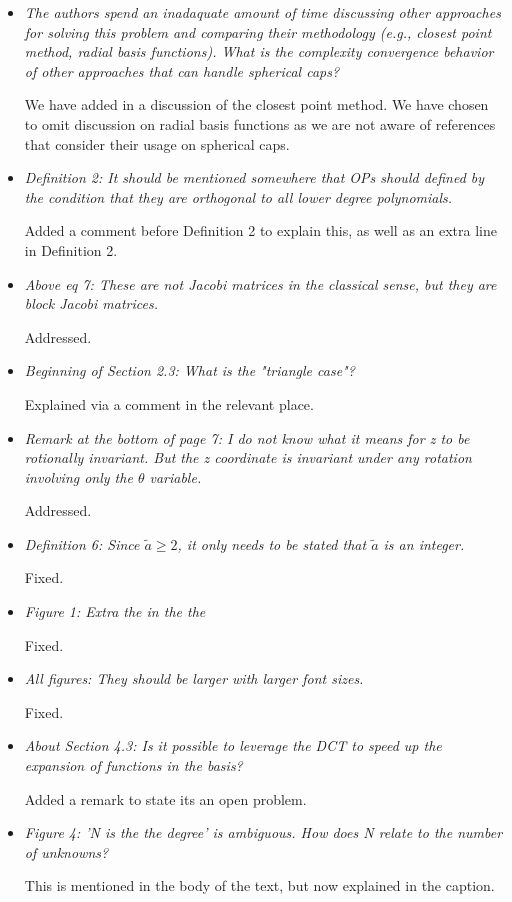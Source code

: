 \documentclass[10pt]{letter}
\newcommand{\comment}[1]{\textit{\color{bluey}#1}}
\begin{document}
\begin{itemize}[parsep=1em,leftmargin=1em]

\item \comment{The authors spend an inadaquate amount of time discussing other approaches for solving this problem and comparing their methodology (e.g., closest point method, radial basis functions). What is the complexity convergence behavior of other approaches that can handle spherical caps?}

We have added in a discussion of the closest point method. We have chosen to omit discussion on radial basis functions as we are not aware of references that consider their usage on spherical caps.

\item \comment{Definition 2: It should be mentioned somewhere that OPs should defined by the condition that they are orthogonal to all lower degree polynomials.}

Added a comment before Definition 2 to explain this, as well as an extra line in Definition 2.


\item \comment{Above eq 7: These are not Jacobi matrices in the classical sense, but they are block Jacobi matrices.}

Addressed.


\item \comment{Beginning of Section 2.3: What is the "triangle case"?}

Explained via a comment in the relevant place.


\item \comment{Remark at the bottom of page 7: I do not know what it means for z to be rotionally invariant. But the z coordinate is invariant under any rotation involving only the $\theta$ variable.}

Addressed.


\item \comment{Definition 6: Since $\tilde a \ge 2$, it only needs to be stated that $\tilde a$ is an integer.}

Fixed.


\item \comment{Figure 1: Extra the in the the}

Fixed.


\item \comment{All figures: They should be larger with larger font sizes.}

Fixed.


\item \comment{About Section 4.3: Is it possible to leverage the DCT to speed up the expansion of functions in the basis?}

Added a remark to state its an open problem.


\item \comment{Figure 4: 'N is the the degree' is ambiguous. How does N relate to the number of unknowns?}

This is mentioned in the body of the text, but now explained in the caption.


\end{itemize}
\end{document}
